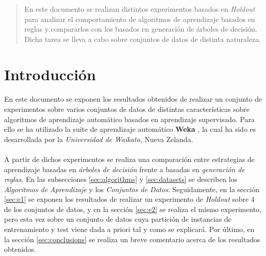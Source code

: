 \documentclass{article}
\begin{document}
	\maketitle %

	\thispagestyle{fancy} %



	\begin{abstract}
		\noindent En este documento se realizan distintos experimentos basados en \emph{Holdout} para analizar el comportamiento de algoritmos de aprendizaje basados en reglas y compararlos con los basados en generación de árboles de decisión. Dicha tarea se lleva a cabo sobre conjuntos de datos de distinta naturaleza.
	\end{abstract}



	\section{Introducción}
	\label{sec:introducción}

		\paragraph{}
		En este documento se exponen los resultados obtenidos de realizar un conjunto de experimentos sobre varios conjuntos de datos de distintas características sobre algoritmos de aprendizaje automático basados en aprendizaje supervisado. Para ello se ha utilizado la suite de aprendizaje automático \textbf{Weka} \cite{tool:weka}, la cual ha sido es desarrollada por la \emph{Universidad de Waikato}, Nueva Zelanda.

		\paragraph{}
		A partir de dichos experimentos se realiza una comparación entre estrategias de aprendizaje basadas en \emph{árboles de decisión} frente a basadas en \emph{generación de reglas}. En las subsecciones \ref{sec:algorithms} y \ref{sec:datasets} se describen los \emph{Algoritmos de Aprendizaje} y los \emph{Conjuntos de Datos}. Seguidamente, en la sección \ref{sec:e1} se exponen los resultados de realizar un experimento de \emph{Holdout} sobre 4 de los conjuntos de datos, y en la sección \ref{sec:e2} se realiza el mismo experimento, pero esta vez sobre un conjunto de datos cuya partición de instancias de entrenamiento y test viene dada a priori tal y como se explicará. Por último, en la sección \ref{sec:conclusions} se realiza un breve comentario acerca de los resultados obtenidos.
\end{document}
